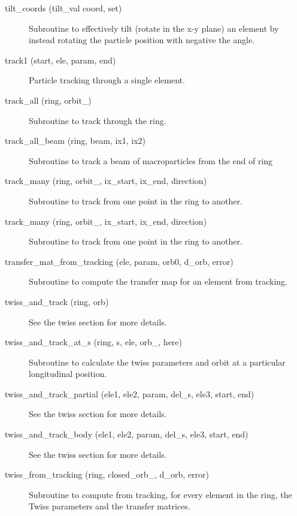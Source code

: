 \begin{description}
\item[tilt\_coords (tilt\_val coord, set)] \Newline
Subroutine to effectively tilt (rotate in the x-y plane) an element by instead rotating the particle position with negative the angle. 

\item[track1 (start, ele, param, end)] \Newline
Particle tracking through a single element. 

\item[track\_all (ring, orbit\_)] \Newline
Subroutine to track through the ring. 

\item[track\_all\_beam (ring, beam, ix1, ix2)] \Newline 
     Subroutine to track a beam of macroparticles from the end of
     ring%

\item[track\_many (ring, orbit\_, ix\_start, ix\_end, direction)] \Newline
Subroutine to track from one point in the ring to another. 

\item[track\_many (ring, orbit\_, ix\_start, ix\_end, direction)] \Newline
Subroutine to track from one point in the ring to another. 

\item[transfer\_mat\_from\_tracking (ele, param, orb0, d\_orb, error)] \Newline
Subroutine to compute the transfer map for an element from tracking. 

\item[twiss\_and\_track (ring, orb)] \Newline
See the twiss section for more details. 

\item[twiss\_and\_track\_at\_s (ring, s, ele, orb\_, here)] \Newline
Subroutine to calculate the twiss parameters and orbit at a particular longitudinal position. 

\item[twiss\_and\_track\_partial (ele1, ele2, param, del\_s, ele3, start, end)] \Newline
See the twiss section for more details. 

\item[twiss\_and\_track\_body (ele1, ele2, param, del\_s, ele3, start, end)] \Newline
See the twiss section for more details. 

\item[twiss\_from\_tracking (ring, closed\_orb\_, d\_orb, error)] \Newline
Subroutine to compute from tracking, for every element in the ring, the Twiss parameters and the transfer matrices. 

\end{description}

